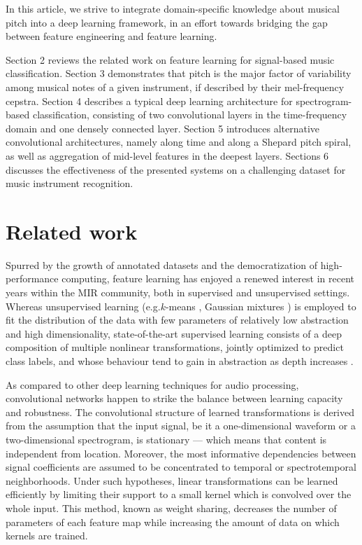 \documentclass{article}
\makeatletter
\newcommand*{\eg}{e.g.\@\xspace}
\makeatother
\begin{document}
In this article, we strive to integrate domain-specific knowledge about musical
pitch into a deep learning framework, in an effort towards bridging the gap
between feature engineering and feature learning.

Section 2 reviews the related work on feature learning for signal-based music
classification.
Section 3 demonstrates that pitch is the major factor of variability among musical
notes of a given instrument, if described by their mel-frequency cepstra.
Section 4 describes a typical deep learning architecture for spectrogram-based
classification, consisting of two convolutional layers in the time-frequency
domain and one densely connected layer.
Section 5 introduces alternative convolutional architectures,
namely along time and along a Shepard pitch spiral, as well as
aggregation of mid-level features in the deepest layers.
Sections 6 discusses the effectiveness of the presented systems on a challenging
dataset for music instrument recognition.

\section{Related work}
Spurred by the growth of annotated datasets and the democratization of
high-performance computing, feature learning has enjoyed a renewed interest
in recent years within the MIR community, both in supervised and unsupervised
settings.
Whereas unsupervised learning (\eg $k$-means \cite{Stowell2014}, Gaussian
mixtures \cite{Joder2009}) is employed to fit the distribution of the data with
few parameters of relatively low abstraction
and high dimensionality, state-of-the-art supervised learning consists of a deep
composition of multiple nonlinear transformations, jointly optimized
to predict class labels, and whose behaviour tend to gain in abstraction as depth
increases \cite{vandenOord2013}.

As compared to other deep learning techniques for audio processing,
convolutional networks happen to strike the balance between
learning capacity and robustness.
The convolutional structure of learned transformations is derived from
the assumption that the input signal, be it a one-dimensional waveform
or a two-dimensional spectrogram, is stationary --- which means that
content is independent from location.
Moreover, the most informative dependencies between signal coefficients
are assumed to be concentrated to temporal or spectrotemporal neighborhoods.
Under such hypotheses, linear transformations can be learned efficiently
by limiting their support to a small kernel which is convolved over
the whole input.
This method, known as weight sharing, decreases the number of parameters
of each feature map while increasing the amount of data on which kernels are
trained.
\end{document}
